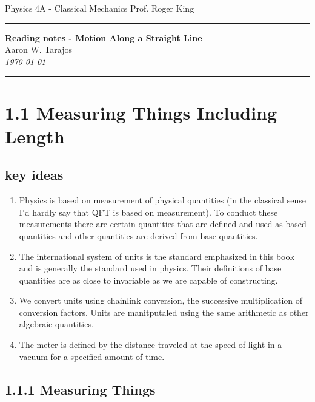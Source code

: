 \documentclass{article}
\begin{document}
\noindent
Physics 4A - Classical Mechanics \hfill Prof. Roger King

\noindent\rule{\textwidth}{0.4pt}

\begin{center}
    \textbf{\LARGE Reading notes - Motion Along a Straight Line} \\
    \vspace{12pt}
    \large Aaron W. Tarajos \\
    \textit{\today}
\end{center}

\noindent\rule{\textwidth}{0.4pt}

\section*{1.1 Measuring Things Including Length}

\subsection*{key ideas}
\begin{enumerate}
	\item Physics is based on measurement of physical quantities (in the classical sense I'd hardly say that QFT is based on measurement). To conduct these measurements there are certain quantities that are defined and used as based quantities and other quantities are derived from base quantities.
	\item The international system of units is the standard emphasized in this book and is generally the standard used in physics. Their definitions of base quantities are as close to invariable as we are capable of constructing.
	\item We convert units using chainlink conversion, the successive multiplication of conversion factors. Units are manitputaled using the same arithmetic as other algebraic quantities.
	\item The meter is defined by the distance traveled at the speed of light in a vacuum for a specified amount of time.
\end{enumerate}

\subsection*{1.1.1 Measuring Things}
\end{document}

